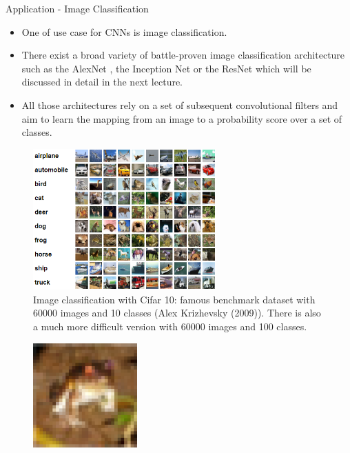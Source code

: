 







\begin{vbframe}{Application - Image Classification}
    \begin{itemize}
        \item One of use case for CNNs is image classification.
        \item There exist a broad variety of battle-proven image classification architecture such as the AlexNet , the Inception Net or the ResNet which will be discussed in detail in the next lecture.
        \item All those architectures rely on a set of subsequent convolutional filters and aim to learn the mapping from an image to a probability score over a set of classes.
    \end{itemize}
\framebreak
    \begin{figure}
        \centering
        \includegraphics[width=7cm]{figure/recognition.png}
        \caption{Image classification with Cifar 10: famous benchmark dataset with 60000 images and 10 classes (Alex Krizhevsky (2009)). There is also a much more difficult version with 60000 images and 100 classes.}
    \end{figure}
\framebreak
    \begin{figure}
        \centering
        \includegraphics[width=4cm]{figure/cifar_frog.png}

\end{figure}
\end{vbframe}
